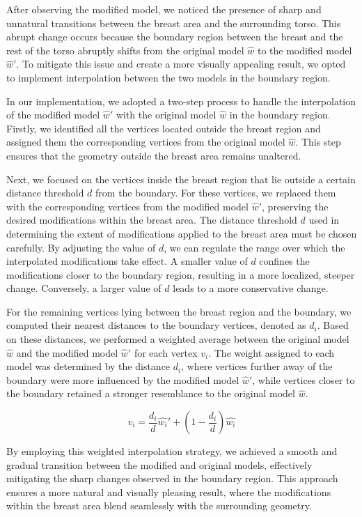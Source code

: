 After observing the modified model, we noticed the presence of sharp and unnatural transitions between the breast area and the surrounding torso. This abrupt change occurs because the boundary 
region between the breast and the rest of the torso abruptly shifts from the original model $\hat{w}$ to the modified model $\hat{w}'$. To mitigate this issue and create a more visually 
appealing result, we opted to implement interpolation between the two models in the boundary region.

In our implementation, we adopted a two-step process to handle the interpolation of the modified model $\hat{w}'$ with the original model $\hat{w}$ in the boundary region. Firstly, 
we identified all the vertices located outside the breast region and assigned them the corresponding vertices from the original model $\hat{w}$. This step ensures that the geometry 
outside the breast area remains unaltered.

Next, we focused on the vertices inside the breast region that lie outside a certain distance threshold $d$ from the boundary. For these vertices, we replaced them with the corresponding 
vertices from the modified model $\hat{w}'$, preserving the desired modifications within the breast area. The distance threshold $d$ used in determining the extent of 
modifications applied to the breast area must be chosen carefully. By adjusting the value of $d$, we can regulate the range over which the interpolated modifications take effect. 
A smaller value of $d$ confines the modifications closer to the boundary region, resulting in a more localized, steeper change. Conversely, a larger value of $d$ leads to a more conservative
change.

For the remaining vertices lying between the breast region and the boundary, we computed their nearest distances to the boundary vertices, denoted as $d_i$. Based on these distances, 
we performed a weighted average between the original model $\hat{w}$ and the modified model $\hat{w}'$ for each vertex $v_i$. The weight assigned to each model was determined by the 
distance $d_i$, where vertices further away of the boundary were more influenced by the modified model $\hat{w}'$, while vertices closer to the boundary retained a stronger resemblance to the 
original model $\hat{w}$.

\[
    v_i = \frac{d_i}{d} \hat{w_i} ' + \left(1 - \frac{d_i}{d}\right) \hat{w_i}
\]

By employing this weighted interpolation strategy, we achieved a smooth and gradual transition between the modified and original models, effectively mitigating the sharp changes 
observed in the boundary region. This approach ensures a more natural and visually pleasing result, where the modifications within the breast area blend seamlessly with the 
surrounding geometry.

